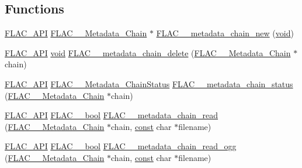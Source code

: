 \subsection*{Functions}
\begin{DoxyCompactItemize}
\item 
\hyperlink{group__flac__export_ga56ca07df8a23310707732b1c0007d6f5}{F\+L\+A\+C\+\_\+\+A\+PI} \hyperlink{group__flac__metadata__level2_gaec6993c60b88f222a52af86f8f47bfdf}{F\+L\+A\+C\+\_\+\+\_\+\+Metadata\+\_\+\+Chain} $\ast$ \hyperlink{group__flac__metadata__level2_gafd1f4f58af29325b067ebc5dc34a0f69}{F\+L\+A\+C\+\_\+\+\_\+metadata\+\_\+chain\+\_\+new} (\hyperlink{png_8h_ac9c84fa68bbad002983e35ce3663c686}{void})
\item 
\hyperlink{group__flac__export_ga56ca07df8a23310707732b1c0007d6f5}{F\+L\+A\+C\+\_\+\+A\+PI} \hyperlink{png_8h_ac9c84fa68bbad002983e35ce3663c686}{void} \hyperlink{group__flac__metadata__level2_ga178898eef72ba9d569b1964fffcb4a8b}{F\+L\+A\+C\+\_\+\+\_\+metadata\+\_\+chain\+\_\+delete} (\hyperlink{group__flac__metadata__level2_gaec6993c60b88f222a52af86f8f47bfdf}{F\+L\+A\+C\+\_\+\+\_\+\+Metadata\+\_\+\+Chain} $\ast$chain)
\item 
\hyperlink{group__flac__export_ga56ca07df8a23310707732b1c0007d6f5}{F\+L\+A\+C\+\_\+\+A\+PI} \hyperlink{group__flac__metadata__level2_gafe2a924893b0800b020bea8160fd4531}{F\+L\+A\+C\+\_\+\+\_\+\+Metadata\+\_\+\+Chain\+Status} \hyperlink{group__flac__metadata__level2_ga3d030e216a6517f23372bb76f0639127}{F\+L\+A\+C\+\_\+\+\_\+metadata\+\_\+chain\+\_\+status} (\hyperlink{group__flac__metadata__level2_gaec6993c60b88f222a52af86f8f47bfdf}{F\+L\+A\+C\+\_\+\+\_\+\+Metadata\+\_\+\+Chain} $\ast$chain)
\item 
\hyperlink{group__flac__export_ga56ca07df8a23310707732b1c0007d6f5}{F\+L\+A\+C\+\_\+\+A\+PI} \hyperlink{ordinals_8h_a95103469f1cbd78b8cf250194985b34e}{F\+L\+A\+C\+\_\+\+\_\+bool} \hyperlink{group__flac__metadata__level2_gadb7d8e9a82aeb43e256f0a948adf5c45}{F\+L\+A\+C\+\_\+\+\_\+metadata\+\_\+chain\+\_\+read} (\hyperlink{group__flac__metadata__level2_gaec6993c60b88f222a52af86f8f47bfdf}{F\+L\+A\+C\+\_\+\+\_\+\+Metadata\+\_\+\+Chain} $\ast$chain, \hyperlink{zconf_8h_a2c212835823e3c54a8ab6d95c652660e}{const} char $\ast$filename)
\item 
\hyperlink{group__flac__export_ga56ca07df8a23310707732b1c0007d6f5}{F\+L\+A\+C\+\_\+\+A\+PI} \hyperlink{ordinals_8h_a95103469f1cbd78b8cf250194985b34e}{F\+L\+A\+C\+\_\+\+\_\+bool} \hyperlink{group__flac__metadata__level2_gae7b34f2929bedea0e14ac14aca253a40}{F\+L\+A\+C\+\_\+\+\_\+metadata\+\_\+chain\+\_\+read\+\_\+ogg} (\hyperlink{group__flac__metadata__level2_gaec6993c60b88f222a52af86f8f47bfdf}{F\+L\+A\+C\+\_\+\+\_\+\+Metadata\+\_\+\+Chain} $\ast$chain, \hyperlink{zconf_8h_a2c212835823e3c54a8ab6d95c652660e}{const} char $\ast$filename)

\end{DoxyCompactItemize}
